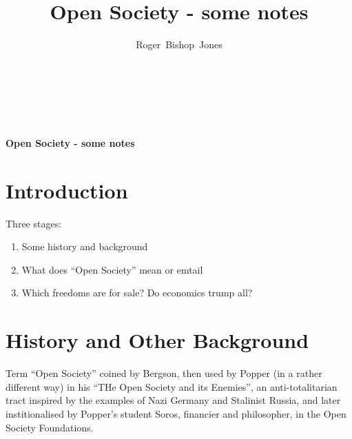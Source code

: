 \documentclass[14pt,titlepage]{extarticle}
\title{Open Society - some notes}
\author{Roger~Bishop~Jones}
\date{\ }
\begin{document}

                               
\begin{titlepage}
\maketitle





\end{titlepage}

\ \

\pagebreak

\begin{centering}
{\LARGE \bf Open Society - some notes}
\end{centering}

\setcounter{tocdepth}{1}
{\parskip-0pt\tableofcontents}




\section{Introduction}

Three stages:

\begin{enumerate}
\item Some history and background
\item What does ``Open Society'' mean or emtail
\item Which freedoms are for sale?  Do economics trump all?
\end{enumerate}

\section{History and Other Background}

Term ``Open Society'' coined by Bergson, then used by Popper (in a rather different way) in his ``THe Open Society and its Enemies'', an anti-totalitarian tract inspired by the examples of Nazi Germany and Stalinist Russia, and later institionalised by Popper's student Soros, financier and philosopher, in the Open Society Foundations.
\end{document}
